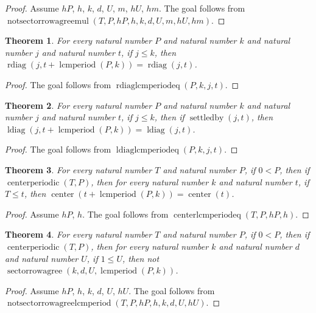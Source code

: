 \documentclass[11pt]{article}
\newtheorem{theorem}{Theorem}[section]
\theoremstyle{definition}
\begin{document}
\begin{proof}
Assume \(hP\), \(h\), \(k\), \(d\), \(U\), \(m\), \(hU\), \(hm\).
The goal follows from \(\operatorname{notsectorrowagreemul}(T, P, hP, h, k, d, U, m, hU, hm)\).
\end{proof}
\begin{theorem}
\label{ll:paper:rdiag-lcmperiod-eq}
For every natural number \(P\) and natural number \(k\) and natural number \(j\) and natural number \(t\), if \(j \le k\), then \(\operatorname{rdiag}(j, t + \operatorname{lcmperiod}(P, k)) = \operatorname{rdiag}(j, t)\).
\end{theorem}
\begin{proof}
The goal follows from \(\operatorname{rdiaglcmperiodeq}(P, k, j, t)\).
\end{proof}
\begin{theorem}
\label{ll:paper:ldiag-lcmperiod-eq}
For every natural number \(P\) and natural number \(k\) and natural number \(j\) and natural number \(t\), if \(j \le k\), then if \(\operatorname{settledby}(j, t)\), then \(\operatorname{ldiag}(j, t + \operatorname{lcmperiod}(P, k)) = \operatorname{ldiag}(j, t)\).
\end{theorem}
\begin{proof}
The goal follows from \(\operatorname{ldiaglcmperiodeq}(P, k, j, t)\).
\end{proof}
\begin{theorem}
\label{ll:paper:center-lcmperiod-eq}
For every natural number \(T\) and natural number \(P\), if \(0 < P\), then if \(\operatorname{centerperiodic}(T, P)\), then for every natural number \(k\) and natural number \(t\), if \(T \le t\), then \(\operatorname{center}(t + \operatorname{lcmperiod}(P, k)) = \operatorname{center}(t)\).
\end{theorem}
\begin{proof}
Assume \(hP\), \(h\).
The goal follows from \(\operatorname{centerlcmperiodeq}(T, P, hP, h)\).
\end{proof}
\begin{theorem}
\label{ll:paper:not-sector-rowagree-lcmperiod}
For every natural number \(T\) and natural number \(P\), if \(0 < P\), then if \(\operatorname{centerperiodic}(T, P)\), then for every natural number \(k\) and natural number \(d\) and natural number \(U\), if \(1 \le U\), then not \(\operatorname{sectorrowagree}(k, d, U, \operatorname{lcmperiod}(P, k))\).
\end{theorem}
\begin{proof}
Assume \(hP\), \(h\), \(k\), \(d\), \(U\), \(hU\).
The goal follows from \(\operatorname{notsectorrowagreelcmperiod}(T, P, hP, h, k, d, U, hU)\).
\end{proof}
\end{document}
